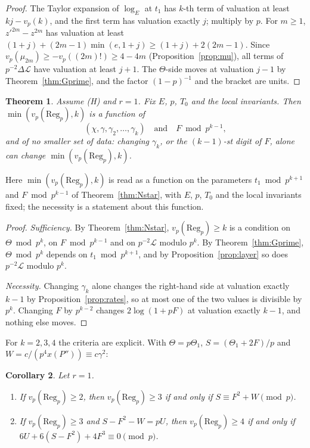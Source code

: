 \documentclass[11pt,a4paper]{amsart}
\newcommand{\Reg}{\mathrm{Reg}}
\newcommand{\cL}{\mathcal{L}}
\theoremstyle{plain}
\newtheorem{theorem}{Theorem}[section]
\newtheorem{corollary}[theorem]{Corollary}
\theoremstyle{definition}
\theoremstyle{remark}
\begin{document}
\begin{proof}
The Taylor expansion of $\log_E$ at $t_1$ has $k$-th term of valuation at least $kj-v_p(k)$, and the first term has valuation exactly $j$; multiply by $p$. For $m\ge1$, $z'^{2m}-z^{2m}$ has valuation at least $(1+j)+(2m-1)\min(e,1+j)\ge(1+j)+2(2m-1)$. Since $v_p(\mu_{2m})\ge-v_p((2m)!)\ge4-4m$ (Proposition~\ref{prop:mu}), all terms of $p^{-2}\Delta\cL$ have valuation at least $j+1$. The $\Theta$-side moves at valuation $j-1$ by Theorem~\ref{thm:Gprime}, and the factor $(1-p)^{-1}$ and the bracket are units.
\end{proof}

\begin{theorem}\label{thm:Gk}
Assume \textup{(H)} and $r=1$. Fix $E$, $p$, $T_0$ and the local invariants. Then $\min(v_p(\Reg_p),k)$ is a function of
\[
(\chi,\gamma,\gamma_2,\dots,\gamma_k)\quad\text{and}\quad F\bmod p^{k-1},
\]
and of no smaller set of data: changing $\gamma_k$, or the $(k-1)$-st digit of $F$, alone can change $\min(v_p(\Reg_p),k)$.
\end{theorem}

Here $\min(v_p(\Reg_p),k)$ is read as a function on the parameters $t_1\bmod p^{k+1}$ and $F\bmod p^{k-1}$ of Theorem~\ref{thm:Nstar}, with $E$, $p$, $T_0$ and the local invariants fixed; the necessity is a statement about this function.

\begin{proof}
\emph{Sufficiency.} By Theorem~\ref{thm:Nstar}, $v_p(\Reg_p)\ge k$ is a condition on $\Theta\bmod p^k$, on $F\bmod p^{k-1}$ and on $p^{-2}\cL$ modulo $p^k$. By Theorem~\ref{thm:Gprime}, $\Theta\bmod p^k$ depends on $t_1\bmod p^{k+1}$, and by Proposition~\ref{prop:layer} so does $p^{-2}\cL$ modulo $p^k$.

\emph{Necessity.} Changing $\gamma_k$ alone changes the right-hand side at valuation exactly $k-1$ by Proposition~\ref{prop:rates}, so at most one of the two values is divisible by $p^k$. Changing $F$ by $p^{k-2}$ changes $2\log(1+pF)$ at valuation exactly $k-1$, and nothing else moves.
\end{proof}

For $k=2,3,4$ the criteria are explicit. With $\Theta=p\Theta_1$, $S=(\Theta_1+2F)/p$ and $W=c/(p^4x(P''))\equiv c\gamma^2$:

\begin{corollary}\label{cor:criteria}
Let $r=1$.
\begin{enumerate}[label=\textup{(\roman*)}]
\item If $v_p(\Reg_p)\ge2$, then $v_p(\Reg_p)\ge3$ if and only if $S\equiv F^2+W\pmod p$.
\item If $v_p(\Reg_p)\ge3$ and $S-F^2-W=pU$, then $v_p(\Reg_p)\ge4$ if and only if $6U+6(S-F^2)+4F^3\equiv0\pmod p$.
\end{enumerate}
\end{corollary}
\end{document}
